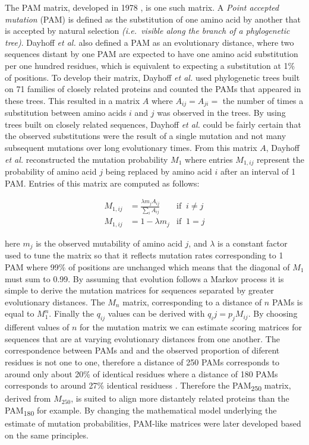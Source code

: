 \documentclass[
  11pt,
  twoside,
  BCOR=10mm,
  listof=totoc]{scrbook}
\begin{document}
The PAM matrix, developed in 1978 \autocite{dayhoffModelEvolutionaryChange1978}, is one such matrix. A \emph{Point accepted mutation} (PAM) is defined as the substitution of one amino acid by another that is accepted by natural selection \emph{(i.e.~visible along the branch of a phylogenetic tree)}. Dayhoff \emph{et al.} also defined a PAM as an evolutionary distance, where two sequences distant by one PAM are expected to have one amino acid substitution per one hundred residues, which is equivalent to expecting a substitution at 1\% of positions. To develop their matrix, Dayhoff \emph{et al.} used phylogenetic trees built on 71 families of closely related proteins and counted the PAMs that appeared in these trees. This resulted in a matrix \(A\) where \(A_{ij}=A_{ji}=\) the number of times a substitution between amino acids \(i\) and \(j\) was observed in the trees. By using trees built on closely related sequences, Dayhoff \emph{et al.} could be fairly certain that the observed substitutions were the result of a single mutation and not many subsequent mutations over long evolutionary times. From this matrix \(A\), Dayhoff \emph{et al.} reconstructed the mutation probability \(M_1\) where entries \(M_{1,ij}\) represent the probability of amino acid \(j\) being replaced by amino acid \(i\) after an interval of 1 PAM. Entries of this matrix are computed as follows:

\begin{align}
M_{1,ij}&=\frac{\lambda m_j A_{ij}}{\sum_i A_{ij}}\;\; & \text{if}\;\;i\neq j\\
M_{1,ij}&=1-\lambda m_j & \text{if}\;\; 1 = j 
\end{align}

here \(m_j\) is the observed mutability of amino acid \(j\), and \(\lambda\) is a constant factor used to tune the matrix so that it reflects mutation rates corresponding to 1 PAM where 99\% of positions are unchanged which means that the diagonal of \(M_1\) must sum to 0.99. By assuming that evolution follows a Markov process it is simple to derive the mutation matrices for sequences separated by greater evolutionary distances. The \(M_n\) matrix, corresponding to a distance of \(n\) PAMs is equal to \(M_1^n\). Finally the \(q_{ij}\) values can be derived with \(q_ij=p_jM_{ij}\). By choosing different values of \(n\) for the mutation matrix we can estimate scoring matrices for sequences that are at varying evolutionary distances from one another. The correspondence between PAMs and and the observed proportion of diferent residues is not one to one, therefore a distance of 250 PAMs corresponds to around only about 20\% of identical residues where a distance of 180 PAMs corresponds to around 27\% identical residuess \autocite{altschulSubstitutionMatrices2013,dayhoffModelEvolutionaryChange1978}. Therefore the PAM\textsubscript{250} matrix, derived from \(M_{250}\), is suited to align more distantely related proteins than the PAM\textsubscript{180} for example. By changing the mathematical model underlying the estimate of mutation probabilities, PAM-like matrices \autocite{mullerModelingAminoAcid2000} were later developed based on the same principles.
\end{document}
